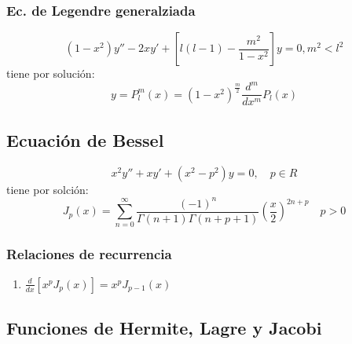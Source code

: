 \documentclass{article}
\begin{document}
\subsubsection*{Ec. de Legendre generalziada}
\[(1-x^2)y'' - 2xy' + \left[l(l-1)-\frac{m^2}{1-x^2}\right]y = 0, m^2<l^2 \]
tiene por solución:
\[ y= P_l^m(x) = (1-x^2)^{\frac{m}{2}} \frac{d^m}{dx^m}P_l(x) \]
\subsection*{Ecuación de Bessel}
\[ x^2y''+xy'+(x^2-p^2)y = 0,\quad p \in R \]
tiene por solción:
\[ J_p(x) = \sum_{n=0}^\infty \frac{(-1)^n}{\Gamma(n+1)\Gamma(n+p+1)}\left( \frac{x}{2} \right)^{2n+p} \quad p>0\]
\subsubsection*{Relaciones de recurrencia}
\begin{enumerate}
    \item $\frac{d}{dx}[x^pJ_p(x)] = x^pJ_{p-1}(x)$
\end{enumerate}

\subsection*{Funciones de Hermite, Lagre y Jacobi}
\end{document}
